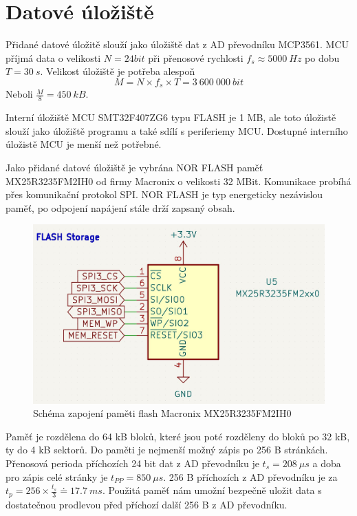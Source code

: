 \section{Datové úložiště}
Přidané datové úložitě slouží jako úložiště dat z AD převodníku MCP3561. MCU příjmá data o velikosti $N = 24 bit$ při přenosové rychlosti $f_s \approx 5000 \ Hz$ po dobu $T = 30 \ s$. Velikost úložiště je potřeba alespoň
\begin{equation*}
    M = N \times f_s \times T = 3 \ 600 \ 000 \ bit
\end{equation*}
Neboli $\frac{M}{8} = 450 \ kB$.
\par
Interní úložiště MCU SMT32F407ZG6 typu FLASH je 1 MB, ale toto úložistě slouží jako úložiště programu a také sdílí s periferiemy MCU. Dostupné interního úložistě MCU je menší než potřebné.
\par
Jako přidané datové úložiště je vybrána NOR FLASH paměť MX25R3235FM2IH0 od firmy Macronix o velikosti 32 MBit. Komunikace probíhá přes komunikační protokol SPI. NOR FLASH je typ energeticky nezávislou paměť, po odpojení napájení stále drží zapsaný obsah.
\begin{figure}[H]
    \label{fig:flash_memory}
    \caption{Schéma zapojení paměti flash Macronix MX25R3235FM2IH0}
    \includegraphics[width=1\textwidth]{pictures/flash_memory.jpg}
\end{figure}
Paměť je rozdělena do 64 kB bloků, které jsou poté rozděleny do bloků po 32 kB, ty do 4 kB sektorů. Do paměti je nejmenší možný zápis po 256 B stránkách. Přenosová perioda příchozích 24 bit dat z AD převodníku je $t_s = 208 \ \mu s$ a doba pro zápis celé stránky je $t_{PP} = 850 \ \mu s$. 256 B příchozích z AD převodníku je za $t_p = 256 \times \frac{t_s}{3} \doteq 17.7 \ ms$.
Použitá paměť nám umožní bezpečně uložit data s dostatečnou prodlevou před příchozí další 256 B z AD převodníku.
